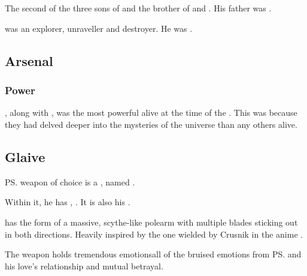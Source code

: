 \section{\QuessanthIshnaruchaefir}
\index{\Ishnaruchaefir}
\index{\QuessanthIshnaruchaefir}
The second of the three sons of \Tiamat and the brother of \Nexagglachel{} and \Secherdamon.
His father was \Iurzmacul. 

\Ishnaruchaefir{} was an explorer, unraveller and destroyer. 
He was . 









\subsection{Arsenal}





\subsubsection{Power}
\Iscrafel, along with \Secherdamon, was the most powerful \dragon alive at the time of the \thirdbanewar.
This was because they had delved deeper into the mysteries of the universe than any others alive. 









\subsection{Glaive} 
\ps{\Ishnaruchaefir} weapon of choice is a , named \Triestessakhin.

Within it, he has , \Triestessakhin{}. 
It is also his . 

\Triestessakhin{} has the form of a massive, scythe-like polearm with multiple blades sticking out in both directions. 
Heavily inspired by the one wielded by Crusnik in the anime \cite{Anime:TrinityBlood}.

The weapon holds tremendous emotions\dash all of the bruised emotions from \ps{\Ishnaruchaefir} and his love's relationship and mutual betrayal. 

